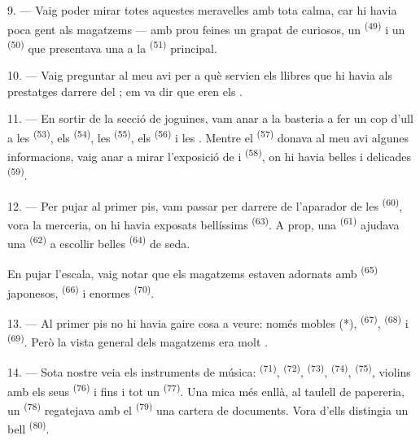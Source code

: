 9. --- Vaig poder mirar totes aquestes meravelles amb tota calma, car hi havia
poca gent als magatzems --- amb prou feines un grapat de curiosos, un
 \textsuperscript{(49)} i un 
\textsuperscript{(50)} que presentava una  a la
 \textsuperscript{(51)} principal.

10. --- Vaig preguntar al meu avi per a què servien els llibres que hi havia als
prestatges darrere del ; em va dir que eren els .

\VUsaut{3.6mm}
\VUsaut{2.8mm}

11. --- En sortir de la secció de joguines, vam anar a la basteria a fer un cop
d'ull a les  \textsuperscript{(53)}, els 
\textsuperscript{(54)}, les  \textsuperscript{(55)}, els
 \textsuperscript{(56)} i les . Mentre el  \textsuperscript{(57)} donava al meu avi algunes
informacions, vaig anar a mirar l'exposició de  i
 \textsuperscript{(58)}, on hi havia belles
 i delicades  \textsuperscript{(59)}.

12. --- Per pujar al primer pis, vam passar per darrere de l'aparador de les
 \textsuperscript{(60)}, vora la merceria, on hi havia exposats
bellíssims  \textsuperscript{(63)}. A prop, una
 \textsuperscript{(61)} ajudava una 
\textsuperscript{(62)} a escollir belles  \textsuperscript{(64)} de
seda.

En pujar l'escala, vaig notar que els magatzems estaven adornats amb
 \textsuperscript{(65)} japonesos, 
\textsuperscript{(66)} i enormes  \textsuperscript{(70)}.

13. --- Al primer pis no hi havia gaire cosa a veure: només mobles (*),
 \textsuperscript{(67)}, 
\textsuperscript{(68)} i  \textsuperscript{(69)}. Però la
vista general dels magatzems era molt .

14. --- Sota nostre veia els instruments de música: 
\textsuperscript{(71)},  \textsuperscript{(72)},
 \textsuperscript{(73)}, 
\textsuperscript{(74)},  \textsuperscript{(75)}, violins amb els
seus  \textsuperscript{(76)} i fins i tot un 
\textsuperscript{(77)}. Una mica més enllà, al taulell de papereria, un
 \textsuperscript{(78)} regatejava amb el 
\textsuperscript{(79)} una cartera de documents. Vora d'ells distingia un bell
 \textsuperscript{(80)}.


